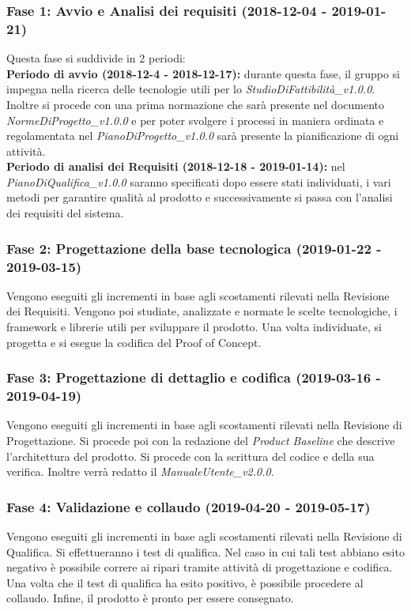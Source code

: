 \subsubsection{Fase 1: Avvio e Analisi dei requisiti (2018-12-04 - 2019-01-21)} 
Questa fase si suddivide in 2 periodi: \\
\textbf{Periodo di avvio (2018-12-4 - 2018-12-17):} 
durante questa fase, il gruppo si impegna nella ricerca delle tecnologie utili per lo \textit{StudioDiFattibilità\_v1.0.0}. Inoltre si procede con una prima normazione che sarà presente nel documento \textit{NormeDiProgetto\_v1.0.0} e per poter svolgere i processi in maniera ordinata e regolamentata nel \textit{PianoDiProgetto\_v1.0.0} sarà presente la pianificazione di ogni attività.\\
\textbf{Periodo di analisi dei Requisiti (2018-12-18 - 2019-01-14):} nel \textit{PianoDiQualifica\_v1.0.0} saranno specificati dopo essere stati individuati, i vari metodi per garantire qualità al prodotto e successivamente si passa con l'analisi dei requisiti del sistema.

\subsubsection{Fase 2: Progettazione della base tecnologica (2019-01-22 - 2019-03-15)}
Vengono eseguiti gli incrementi in base agli scostamenti rilevati nella Revisione dei Requisiti.
Vengono poi studiate, analizzate e normate le scelte tecnologiche, i framework e librerie utili per sviluppare il prodotto. Una volta individuate, si progetta e si esegue la codifica del Proof of Concept.\\

\subsubsection{Fase 3: Progettazione di dettaglio e codifica (2019-03-16 - 2019-04-19)}
Vengono eseguiti gli incrementi in base agli scostamenti rilevati nella Revisione di Progettazione.
Si procede poi con la redazione del \textit{Product Baseline} che descrive l'architettura del prodotto.
Si procede con la scrittura del codice e della sua verifica.
Inoltre verrà redatto il \textit{ManualeUtente\_v2.0.0}.\\

\subsubsection{Fase 4: Validazione e collaudo (2019-04-20 - 2019-05-17)}
Vengono eseguiti gli incrementi in base agli scostamenti rilevati nella Revisione di Qualifica.
Si effettueranno i test di qualifica. Nel caso in cui tali test abbiano esito negativo è possibile correre ai ripari tramite attività di progettazione e codifica. Una volta che il test di qualifica ha esito positivo, è possibile procedere al collaudo.
Infine, il prodotto è pronto per essere consegnato.

